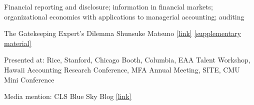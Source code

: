 \newcommand{\co}{\textsuperscript{†}}




\begin{cventries}

\cventryLONG
	{Financial reporting and disclosure; information in financial markets; organizational economics with applications to managerial accounting; auditing}  

\end{cventries}

\vspace{.3cm}


\paperentry
	{The Gatekeeping Expert's Dilemma}   %
	{Shunsuke Matsuno}   %
	{}   %
	{\href{https://papers.ssrn.com/sol3/papers.cfm?abstract_id=5583773}{[link]} \href{https://shunsukematsuno.github.io/research/gatekeeping-experts-dilemma/Matsuno-Gatekeeping-Experts-Dilemma-Supplementary-Material.pdf}{[supplementary material]}}  %
	{}   %
	{}   %
	{
	\begin{cvitems}  %
		\item {Presented at: Rice, Stanford, Chicago Booth, Columbia, EAA Talent Workshop, Hawaii Accounting Research Conference, MFA Annual Meeting, SITE, CMU Mini Conference} 
		\item {Media mention: CLS Blue Sky Blog \href{https://clsbluesky.law.columbia.edu/2025/11/12/how-strategic-vagueness-helps-gatekeepers-offer-guidance-without-being-gamed/}{[link]}}
	\end{cvitems}
	}
	{%
	}


